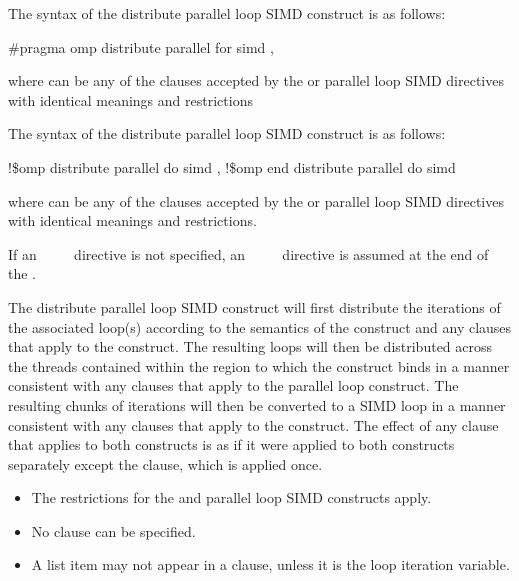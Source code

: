 {{{{\syntax
\ccppspecificstart
The syntax of the distribute parallel loop SIMD construct is as follows:

\begin{boxedcode}
\#pragma omp distribute parallel for simd \plc{[clause[ [},\plc{] clause] ... ] newline}
\end{boxedcode}

where  can be any of the clauses accepted by the  or parallel loop 
SIMD directives with identical meanings and restrictions
\ccppspecificend

\fortranspecificstart
The syntax of the distribute parallel loop SIMD construct is as follows:

\begin{boxedcode}
!\$omp distribute parallel do simd \plc{[clause[ [},\plc{] clause] ... ]}
\plc{[}!\$omp end distribute parallel do simd\plc{]}
\end{boxedcode}

where  can be any of the clauses accepted by the  or parallel loop 
SIMD directives with identical meanings and restrictions.

If an ~~~~ directive is not specified, an 
~~~~ directive is assumed at the end of the .
\fortranspecificend

\descr
The distribute parallel loop SIMD construct will first distribute the iterations of the 
associated loop(s) according to the semantics of the  construct and any 
clauses that apply to the  construct. The resulting loops will then be 
distributed across the threads contained within the  region to which the
 construct binds in a manner consistent with any clauses that apply to the 
parallel loop construct. The resulting chunks of iterations will then be converted to a 
SIMD loop in a manner consistent with any clauses that apply to the  construct. 
The effect of any clause that applies to both constructs is as if it were applied to both constructs separately except the  clause, which is applied once.


\restrictions
\begin{itemize}
\item The restrictions for the  and parallel loop SIMD constructs apply.
\item No  clause can be specified.
\item A list item may not appear in a  clause, unless it is the loop iteration variable.
\end{itemize}

}}}}
